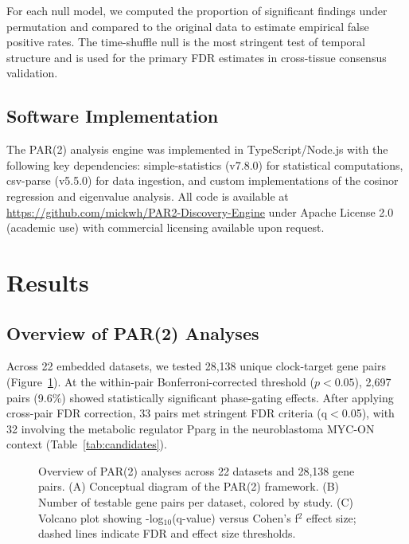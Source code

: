\documentclass[11pt,a4paper]{article}
\begin{document}
For each null model, we computed the proportion of significant findings under permutation and compared to the original data to estimate empirical false positive rates. The time-shuffle null is the most stringent test of temporal structure and is used for the primary FDR estimates in cross-tissue consensus validation.

\subsection{Software Implementation}

The PAR(2) analysis engine was implemented in TypeScript/Node.js with the following key dependencies: simple-statistics (v7.8.0) for statistical computations, csv-parse (v5.5.0) for data ingestion, and custom implementations of the cosinor regression and eigenvalue analysis. All code is available at \url{https://github.com/mickwh/PAR2-Discovery-Engine} under Apache License 2.0 (academic use) with commercial licensing available upon request.

\section{Results}

\subsection{Overview of PAR(2) Analyses}

Across 22 embedded datasets, we tested 28,138 unique clock-target gene pairs (Figure~\ref{fig:overview}). At the within-pair Bonferroni-corrected threshold ($p < 0.05$), 2,697 pairs (9.6\%) showed statistically significant phase-gating effects. After applying cross-pair FDR correction, 33 pairs met stringent FDR criteria (q$<$0.05), with 32 involving the metabolic regulator Pparg in the neuroblastoma MYC-ON context (Table~\ref{tab:candidates}).

\begin{figure}[H]
\centering
{}
\caption{Overview of PAR(2) analyses across 22 datasets and 28,138 gene pairs. (A) Conceptual diagram of the PAR(2) framework. (B) Number of testable gene pairs per dataset, colored by study. (C) Volcano plot showing -log$_{10}$(q-value) versus Cohen's f$^2$ effect size; dashed lines indicate FDR and effect size thresholds.}
\label{fig:overview}
\end{figure}
\end{document}
